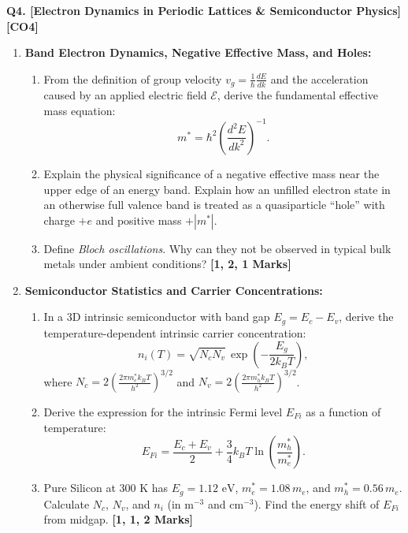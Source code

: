 \documentclass[11pt,a4paper]{article}
\begin{document}
\vspace{4pt}
\noindent\textbf{Q4. [Electron Dynamics in Periodic Lattices \& Semiconductor Physics]} \hfill \textbf{[CO4]}
\begin{enumerate}[label=(\alph*),leftmargin=1.8em,itemsep=4pt]
    \item \textbf{Band Electron Dynamics, Negative Effective Mass, and Holes:}
    \begin{enumerate}[label=(\roman*),itemsep=1.5pt]
        \item From the definition of group velocity $v_g = \frac{1}{\hbar}\frac{dE}{dk}$ and the acceleration caused by an applied electric field $\mathcal{E}$, derive the fundamental effective mass equation:
        \[
        m^* = \hbar^2 \left( \frac{d^2E}{dk^2} \right)^{-1}.
        \]
        \item Explain the physical significance of a negative effective mass near the upper edge of an energy band. Explain how an unfilled electron state in an otherwise full valence band is treated as a quasiparticle ``hole'' with charge $+e$ and positive mass $+|m^*|$.
        \item Define \textit{Bloch oscillations}. Why can they not be observed in typical bulk metals under ambient conditions? \hfill\textbf{[1, 2, 1 Marks]}
    \end{enumerate}

    \item \textbf{Semiconductor Statistics and Carrier Concentrations:}
    \begin{enumerate}[label=(\roman*),itemsep=1.5pt]
        \item In a 3D intrinsic semiconductor with band gap $E_g = E_c - E_v$, derive the temperature-dependent intrinsic carrier concentration:
        \[
        n_i(T) = \sqrt{N_c N_v}\, \exp\left(-\frac{E_g}{2 k_B T}\right),
        \]
        where $N_c = 2\left(\frac{2\pi m_e^* k_B T}{h^2}\right)^{3/2}$ and $N_v = 2\left(\frac{2\pi m_h^* k_B T}{h^2}\right)^{3/2}$.
        \item Derive the expression for the intrinsic Fermi level $E_{Fi}$ as a function of temperature:
        \[
        E_{Fi} = \frac{E_c + E_v}{2} + \frac{3}{4} k_B T \ln\left( \frac{m_h^*}{m_e^*} \right).
        \]
        \item Pure Silicon at $300\text{ K}$ has $E_g = 1.12\text{ eV}$, $m_e^* = 1.08\,m_e$, and $m_h^* = 0.56\,m_e$. Calculate $N_c$, $N_v$, and $n_i$ (in $\text{m}^{-3}$ and $\text{cm}^{-3}$). Find the energy shift of $E_{Fi}$ from midgap. \hfill\textbf{[1, 1, 2 Marks]}
    \end{enumerate}
\end{enumerate}
\end{document}
